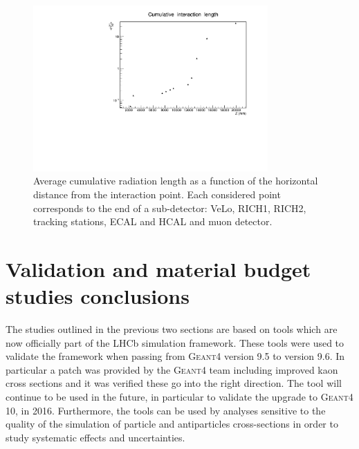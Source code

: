 \begin{figure}[t]
\centering \includegraphics[width=0.8\textwidth]{Detector/figs/validation/radlenght/cuminterLength_vs_Z.pdf}
\caption{Average cumulative radiation length as a function of the horizontal 
distance from the interaction point. Each considered point corresponds to the end of a sub-detector:
VeLo, RICH1, RICH2, tracking stations, ECAL and HCAL and muon detector. }
\label{fig:cumradlZ}
\end{figure}


\section{Validation and material budget studies conclusions}
\label{sec:radlength_conlsusions}
The studies outlined in the previous two sections are based on tools which are now officially 
part of the LHCb simulation framework. These tools were used to validate the framework when 
passing from \textsc{Geant4} version 9.5 to version 9.6.
In particular a patch was provided by the \textsc{Geant4} team including
improved kaon cross sections and it was verified these go into the right direction.
The tool will continue to be used in the future,
in particular to validate the upgrade to \textsc{Geant4} 10, in 2016.
Furthermore, the tools can be used by analyses sensitive to the quality of the simulation 
of particle and antiparticles cross-sections in order to study systematic effects and uncertainties.



